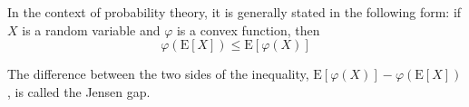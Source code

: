 In the context of probability theory, it is generally stated in the following form: if $X$ is a random variable and $\varphi$ is a convex function, then
\begin{equation}
  \label{eq:41}
\varphi(\mathrm{E}[X]) \leq \mathrm{E}[\varphi(X)]  
\end{equation}

The difference between the two sides of the inequality, $\mathrm{E}[\varphi(X)]-\varphi(\mathrm{E}[X])$, is called the Jensen gap.



